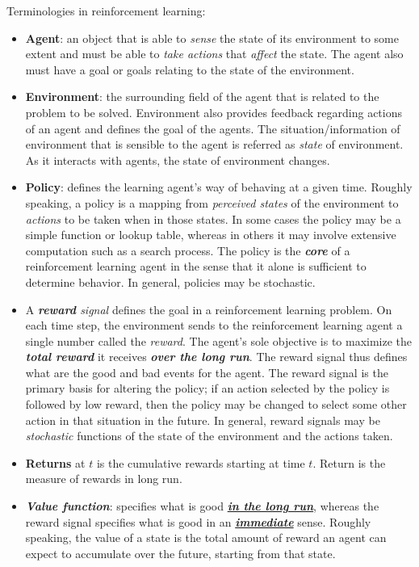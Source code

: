\documentclass[11pt]{article}
\begin{document}
Terminologies in reinforcement learning:
\begin{itemize}
\item \textbf{Agent}: an object that is able to \emph{sense} the state of its environment to some extent and must be able to \emph{take actions} that \emph{affect} the state. The agent also must have a goal or goals relating to the state of the environment.

\item \textbf{Environment}: the surrounding field of the agent that is related to the problem to be solved. Environment also provides feedback regarding actions of an agent and defines the goal of the agents. The situation/information of environment that is sensible to the agent is referred as \emph{state} of environment. As it interacts with agents, the state of environment changes. 

\item \textbf{Policy}: defines the learning agent's way of behaving at a given time. Roughly speaking, a policy is a mapping from \emph{perceived states} of the environment to \emph{actions} to be taken when in those states. In some cases the policy may be a simple function or lookup table, whereas in others it may involve extensive computation such as a search process. The policy is the \emph{\textbf{core}} of a reinforcement learning agent in the sense that it alone is sufficient to determine behavior. In general, policies may be stochastic.

\item A \emph{\textbf{reward} signal} defines the goal in a reinforcement learning problem. On each time step, the environment sends to the reinforcement learning agent a single number called the \emph{reward}. The agent's sole objective is to maximize the \emph{\textbf{total reward}} it receives \emph{\textbf{over the long run}}. The reward signal thus defines what are the good and bad events for the agent. The reward signal is the primary basis for altering the policy; if an action selected by the policy is followed by low reward, then the policy may be changed to select some other action in that situation in the future. In general, reward signals may be \emph{stochastic} functions of the state of the environment and the actions taken.

\item \textbf{Returns} at $t$ is the cumulative rewards starting at time $t$. Return is the measure of rewards in long run. 

\item \emph{\textbf{Value function}}: specifies what is good  \underline{\emph{\textbf{in the long run}}}, whereas the reward signal specifies what is good in an  \underline{\emph{\textbf{immediate}}} sense. Roughly speaking, the value of a state is the total amount of reward an  agent can expect to accumulate over the future, starting from that state.


\end{itemize}
\end{document}
